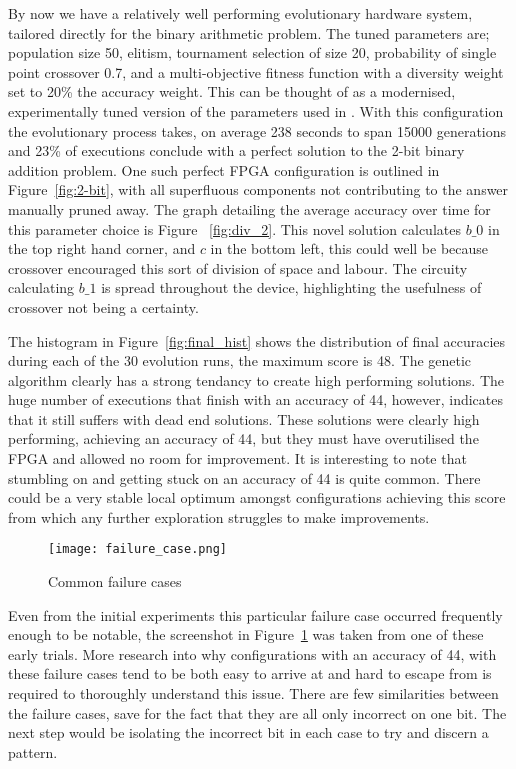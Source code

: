 By now we have a relatively well performing evolutionary hardware system,
tailored directly for the binary arithmetic problem. The tuned parameters
are; population size 50, elitism, tournament selection of size 20,
probability of single point crossover 0.7, and a multi-objective fitness function
with a diversity weight set to 20\% the accuracy weight.
This can be thought of as a modernised, experimentally tuned version of the
parameters used in \cite{10.1007/3-540-63173-9_61}.
With this configuration
the evolutionary process takes, on average 238 seconds to span 15000 generations
and 23\% of executions conclude with a perfect solution to the 2-bit binary addition
problem. One such perfect FPGA configuration is outlined in Figure~\ref{fig:2-bit},
with all superfluous components not contributing to the answer manually pruned away.
The graph detailing the average accuracy over time for this parameter choice is Figure
~\ref{fig:div_2}.
This novel solution calculates $b\_0$ in the top right hand corner, and $c$ in the
bottom left, this could well be because crossover encouraged this sort of division
of space and labour. The circuity calculating $b\_1$ is spread throughout the device,
highlighting the usefulness of crossover not being a certainty.

The histogram in Figure~\ref{fig:final_hist} shows the distribution of final accuracies
during each of the 30 evolution runs, the maximum score is 48. The genetic algorithm
clearly has a strong tendancy to create high performing solutions. The huge number of
executions that finish with an accuracy of 44, however, indicates that it still suffers
with dead end solutions. These solutions were clearly high performing, achieving an
accuracy of 44, but they must have overutilised the FPGA and allowed no room for
improvement. It is interesting to note that stumbling on and getting stuck on an accuracy
of 44 is quite common. There could be a very stable local optimum amongst configurations
achieving this score from which any further exploration struggles to make improvements.

\begin{figure}
	\centering
	\texttt{[image: failure\_case.png]}
	\caption{Common failure cases}
	\label{fig:fail}
\end{figure}

Even from the initial experiments this particular failure case occurred frequently enough
to be notable,
the screenshot in Figure~\ref{fig:fail} was taken from one of these early trials.
More research into why configurations with an accuracy of 44, with these failure cases
tend to be both easy
to arrive at and hard to escape from is required to thoroughly understand this
issue. There are few similarities between the failure cases, save for the fact
that they are all only incorrect on one bit. The next step would be isolating the
incorrect bit in each case to try and discern a pattern.

